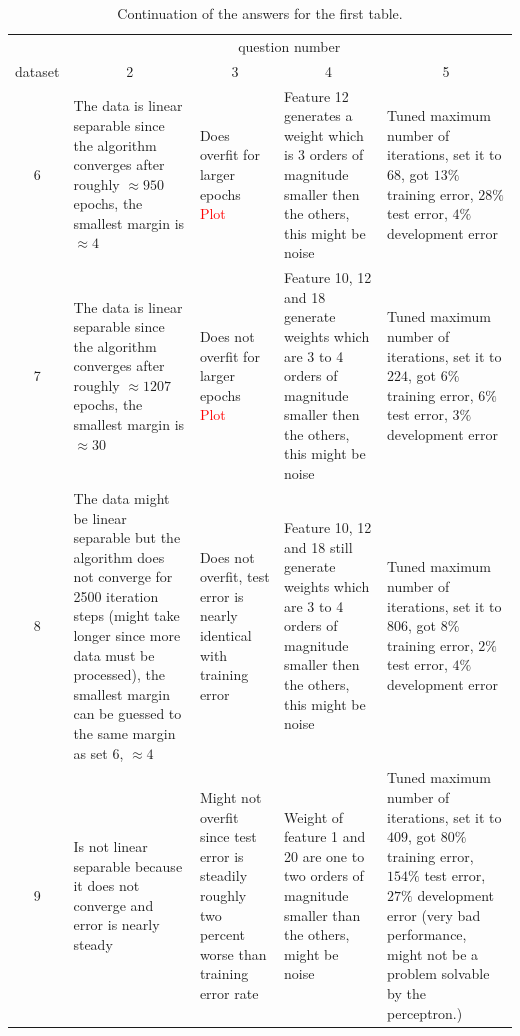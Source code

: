 \documentclass[12pt]{article}
\begin{document}
\begin{table}[h!]
	\centering
	\begin{tabularx}{\textwidth}{c|X|X|X|X|}
		& \multicolumn{4}{c|}{question number} \\
		dataset & \multicolumn{1}{c}{2} & \multicolumn{1}{c}{3} & \multicolumn{1}{c}{4} & \multicolumn{1}{c|}{5} \\
		\midrule
		6     &   The data is linear separable since the algorithm converges after roughly $\approx 950$ epochs, the smallest margin is $\approx 4$     &    Does overfit for larger epochs \textcolor{red}{Plot}   &   Feature 12 generates a weight which is 3 orders of magnitude smaller then the others, this might be noise    & Tuned maximum number of iterations, set it to $68$, got $13\%$ training error, $28\%$ test error, $4\%$ development error \\
		\midrule
		7     &   The data is linear separable since the algorithm converges after roughly $\approx 1207$ epochs,  the smallest margin is $\approx 30$    &    Does not overfit for larger epochs \textcolor{red}{Plot}   &   Feature 10, 12 and 18 generate weights which are 3 to 4 orders of magnitude smaller then the others, this might be noise    & Tuned maximum number of iterations, set it to $224$, got $6\%$ training error, $6\%$ test error, $3\%$ development error \\
		\midrule
		8     &   The data might be linear separable but the algorithm does not converge for 2500 iteration steps (might take longer since more data must be processed),  the smallest margin can be guessed to the same margin as set 6,  $\approx 4$    &    Does not overfit, test error is nearly identical with training error    &   Feature 10, 12 and 18 still generate weights which are 3 to 4 orders of magnitude smaller then the others, this might be noise    & Tuned maximum number of iterations, set it to $806$, got $8\%$ training error, $2\%$ test error, $4\%$ development error \\
		\midrule
		9     &   Is not linear separable because it does not converge and error is nearly steady    &    Might not overfit since test error is steadily roughly two percent worse than training error rate   &   Weight of feature 1 and 20 are one to two orders of magnitude smaller than the others, might be noise    & Tuned maximum number of iterations, set it to $409$, got $80\%$ training error, $154\%$ test error, $27\%$ development error (very bad performance, might not be a problem solvable by the perceptron.) \\
		\bottomrule
	\end{tabularx}%
	\caption{Continuation of the answers for the first table.}
	\label{tab:2}%
\end{table}%
\end{document}
